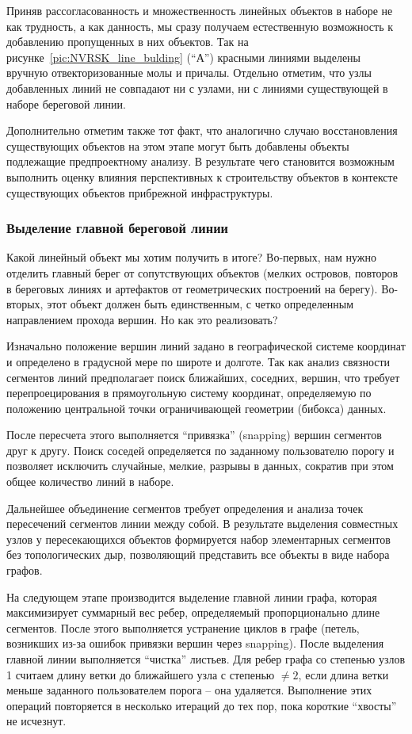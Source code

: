 Приняв рассогласованность и множественность линейных объектов в наборе не как трудность, а как данность, мы сразу получаем естественную возможность к добавлению пропущенных в них объектов.
Так на рисунке~\ref{pic:NVRSK_line_bulding} (\enquote{А}) красными линиями выделены вручную отвекторизованные молы и причалы.
Отдельно отметим, что узлы добавленных линий не совпадают ни с узлами, ни с линиями существующей в наборе береговой линии.

Дополнительно отметим также тот факт, что аналогично случаю восстановления существующих объектов на этом этапе могут быть добавлены объекты подлежащие предпроектному анализу.
В результате чего становится возможным выполнить оценку влияния перспективных к строительству объектов в контексте существующих объектов прибрежной инфраструктуры.

\subsubsection{Выделение главной береговой линии}
\label{sec:main_line_bulding}

Какой линейный объект мы хотим получить в итоге?
Во-первых, нам нужно отделить главный берег от сопутствующих объектов (мелких островов, повторов в береговых линиях и артефактов от геометрических построений на берегу).
Во-вторых, этот объект должен быть единственным, с четко определенным направлением прохода вершин.
Но как это реализовать?

Изначально положение вершин линий задано в географической системе координат и определено в градусной мере по широте и долготе.
Так как анализ связности сегментов линий предполагает поиск ближайших, соседних, вершин, что требует перепроецирования в прямоугольную систему координат, определяемую по положению центральной точки ограничивающей геометрии (бибокса) данных.

После пересчета этого выполняется \enquote{привязка} (snapping) вершин сегментов друг к другу.
Поиск соседей определяется по заданному пользователю порогу и позволяет исключить случайные, мелкие, разрывы в данных, сократив при этом общее количество линий в наборе.

Дальнейшее объединение сегментов требует определения и анализа точек пересечений сегментов линии между собой.
В результате выделения совместных узлов у пересекающихся объектов формируется набор элементарных сегментов без топологических дыр, позволяющий представить все объекты в виде набора графов.

На следующем этапе производится выделение главной линии графа, которая максимизирует суммарный вес ребер, определяемый пропорционально длине сегментов.
После этого выполняется устранение циклов в графе (петель, возникших из-за ошибок привязки вершин через snapping). 
После выделения главной линии выполняется \enquote{чистка} листьев.
Для ребер графа со степенью узлов 1 считаем длину ветки до ближайшего узла с степенью $≠ 2$, если длина ветки меньше заданного пользователем порога -- она удаляется.
Выполнение этих операций повторяется в несколько итераций до тех пор, пока короткие \enquote{хвосты} не исчезнут.

